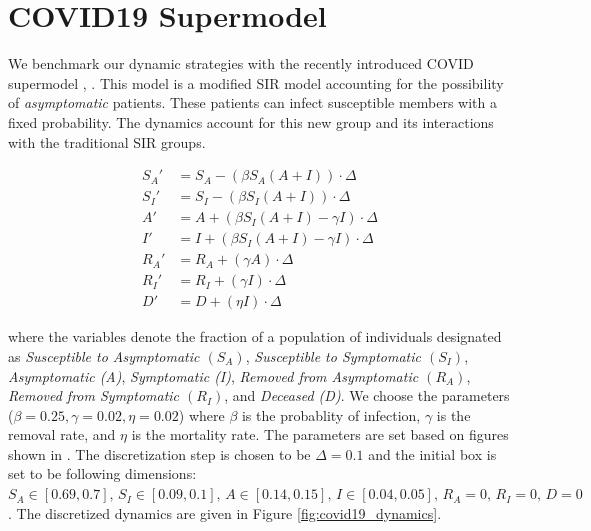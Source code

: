 \section{COVID19 Supermodel}
\label{sec:covid}
We benchmark our dynamic strategies with the recently introduced COVID supermodel \cite{ansumali2020modelling}, \cite{indiansuper2020supermodel}. This model is a modified SIR model accounting for the possibility of \emph{asymptomatic} patients. These patients can infect susceptible members with a fixed probability. The dynamics account for this new group and its interactions with the traditional SIR groups.

\begin{center}
\begin{equation*}
  \begin{split}
   S_A' & = S_A  -(\beta S_A(A+I))\cdot \Delta \\
   S_I' & = S_I  -(\beta S_I (A + I))\cdot \Delta \\
   A' & = A + (\beta S_I(A+I) - \gamma I)\cdot \Delta \\
   I' & = I + (\beta S_I (A+I) - \gamma I)\cdot  \Delta \\
   R_A' & = R_A + (\gamma A)\cdot \Delta \\
   R_I' & = R_I + (\gamma I)\cdot \Delta \\
   D' & = D + (\eta I)\cdot \Delta
  \end{split}
\end{equation*}
\label{fig:covid19_dynamics}
\end{center}

where the variables denote the fraction of a population of individuals designated as \emph{Susceptible to Asymptomatic $(S_A)$}, \emph{Susceptible to Symptomatic $(S_I)$}, \emph{Asymptomatic (A)}, \emph{Symptomatic (I)}, \emph{Removed from Asymptomatic $(R_A)$}, \emph{Removed from Symptomatic $(R_I)$}, and \emph{Deceased (D)}. We choose the parameters ($\beta = 0.25, \gamma=0.02, \eta=0.02$) where $\beta$ is the probablity of infection, $\gamma$ is the removal rate, and $\eta$ is the mortality rate. The parameters are set based on figures shown in \cite{ansumali2020modelling}. The discretization step is chosen to be $\Delta = 0.1$ and the initial box is set to be following dimensions: $S_A  \in [0.69, 0.7], \, S_I \in [0.09, 0.1], \, A \in [0.14, 0.15], \, I \in [0.04, 0.05], \, R_A  = 0,\, R_I  = 0, \, D  = 0$. The discretized dynamics are given in Figure \ref{fig:covid19_dynamics}.

